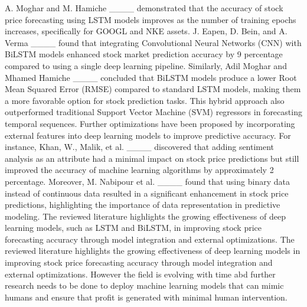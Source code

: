 A. Moghar and M. Hamiche ____ demonstrated that the accuracy of stock price forecasting using LSTM models improves as the number of training epochs increases, specifically for GOOGL and NKE assets. J. Eapen, D. Bein, and A. Verma ____ found that integrating Convolutional Neural Networks (CNN) with BiLSTM models enhanced stock market prediction accuracy by 9 percentage compared to using a single deep learning pipeline. Similarly, Adil Moghar and Mhamed Hamiche ____ concluded that BiLSTM models produce a lower Root Mean Squared Error (RMSE) compared to standard LSTM models, making them a more favorable option for stock prediction tasks. This hybrid approach also outperformed traditional Support Vector Machine (SVM) regressors in forecasting temporal sequences. Further optimizations have been proposed by incorporating external features into deep learning models to improve predictive accuracy. For instance, Khan, W., Malik, et al. ____ discovered that adding sentiment analysis as an attribute had a minimal impact on stock price predictions but still improved the accuracy of machine learning algorithms by approximately 2 percentage. Moreover, M. Nabipour et al. ____ found that using binary data instead of continuous data resulted in a significant enhancement in stock price predictions, highlighting the importance of data representation in predictive modeling. The reviewed literature highlights the growing effectiveness of deep learning models, such as LSTM and BiLSTM, in improving stock price forecasting accuracy through model integration and external optimizations. The reviewed literature highlights the growing effectiveness of deep learning models in improving stock price forecasting accuracy through model integration and external optimizations. However the field is evolving with time abd further research needs to be done to deploy machine learning models that can mimic humans and ensure that profit is generated with minimal human intervention.


